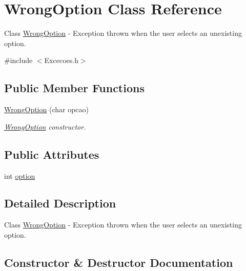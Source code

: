 \hypertarget{class_wrong_option}{}\section{Wrong\+Option Class Reference}
\label{class_wrong_option}


Class \hyperlink{class_wrong_option}{Wrong\+Option} -\/ Exception thrown when the user selects an unexisting option.  




{\ttfamily \#include $<$Excecoes.\+h$>$}

\subsection*{Public Member Functions}
\begin{DoxyCompactItemize}
\item 
\hyperlink{class_wrong_option_a8fa8678af87265b47bc86dfea565dcc9}{Wrong\+Option} (char opcao)
\begin{DoxyCompactList}\small\item\em \hyperlink{class_wrong_option}{Wrong\+Option} constructor. \end{DoxyCompactList}\end{DoxyCompactItemize}
\subsection*{Public Attributes}
\begin{DoxyCompactItemize}
\item 
int \hyperlink{class_wrong_option_a809170ee148dba4cf2638369d55b09a4}{option}
\end{DoxyCompactItemize}


\subsection{Detailed Description}
Class \hyperlink{class_wrong_option}{Wrong\+Option} -\/ Exception thrown when the user selects an unexisting option. 

\subsection{Constructor \& Destructor Documentation}
\mbox{\label{class_wrong_option_a8fa8678af87265b47bc86dfea565dcc9}} 
